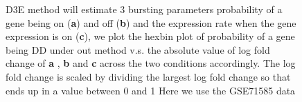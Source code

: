 \documentclass[aoas,preprint]{imsart}
\begin{document}
\begin{figure}[H]
\caption{D3E method will estimate 3 bursting parameters probability of a gene being on (\textbf{a}) and off (\textbf{b}) and the expression rate when the gene expression is on (\textbf{c}), we plot the hexbin plot of probability of a gene being DD under out method v.s. the absolute value of log fold change of \textbf{a} , \textbf{b} and \textbf{c}  across the two conditions accordingly. The log fold change is scaled by dividing the largest log fold change so that ends up in a value between 0 and 1 Here we use the GSE71585 data }
\end{figure}
\end{document}
